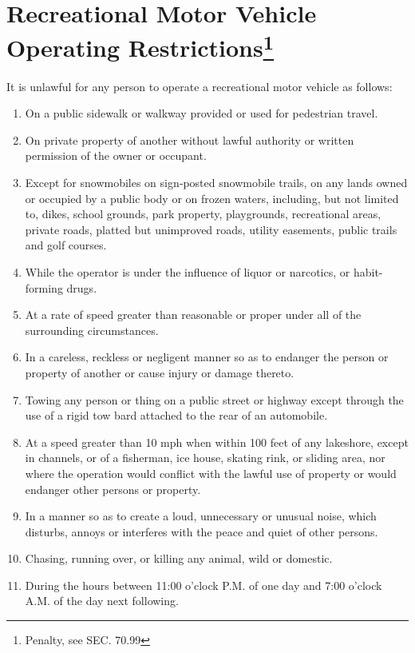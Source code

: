 \section{Recreational Motor Vehicle Operating Restrictions\footnote{Penalty, see SEC. 70.99}}
It is unlawful for any person to operate a recreational motor vehicle as follows:
\begin{enumerate}[{\indent}A)]
    \item On a public sidewalk or walkway provided or used for pedestrian travel.
    \item On private property of another without lawful authority or written permission of the owner or occupant.
    \item Except for snowmobiles on sign‑posted snowmobile trails, on any lands owned or occupied by a public body or on frozen waters, including, but not limited to, dikes, school grounds, park property, playgrounds, recreational areas, private roads, platted but unimproved roads, utility easements, public trails and golf courses.
    \item While the operator is under the influence of liquor or narcotics, or habit-forming drugs.
    \item At a rate of speed greater than reasonable or proper under all of the surrounding circumstances.
    \item In a careless, reckless or negligent manner so as to endanger the person or property of another or cause injury or damage thereto.
    \item Towing any person or thing on a public street or highway except through the use of a rigid tow bard attached to the rear of an automobile.
    \item At a speed greater than 10 mph when within 100 feet of any lakeshore, except in channels, or of a fisherman, ice house, skating rink, or sliding area, nor where the operation would conflict with the lawful use of property or would endanger other persons or property.
    \item In a manner so as to create a loud, unnecessary or unusual noise, which disturbs, annoys or interferes with the peace and quiet of other persons.
    \item Chasing, running over, or killing any animal, wild or domestic.
    \item During the hours between 11:00 o'clock P.M. of one day and 7:00 o'clock A.M. of the day next following.
\end{enumerate}

